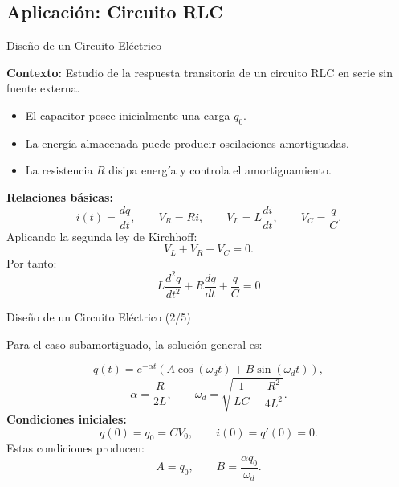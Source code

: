\documentclass[../../main.tex]{subfiles}
\begin{document}

\subsection{Aplicación: Circuito RLC}

\begin{frame}{Dise\~no de un Circuito El\'ectrico}

\textbf{Contexto:}
Estudio de la respuesta transitoria de un circuito RLC en serie
sin fuente externa.
\begin{itemize}
  \item El capacitor posee inicialmente una carga \(q_0\).
  \item La energ\'ia almacenada puede producir oscilaciones amortiguadas.
  \item La resistencia \(R\) disipa energ\'ia y controla el amortiguamiento.
\end{itemize}
\textbf{Relaciones b\'asicas:}
\[
i(t)=\frac{dq}{dt},
\qquad
V_R=Ri,
\qquad
V_L=L\frac{di}{dt},
\qquad
V_C=\frac{q}{C}.
\]
Aplicando la segunda ley de Kirchhoff:
\[
V_L+V_R+V_C=0.
\]
Por tanto:
\[
\boxed{
L\frac{d^2q}{dt^2}
+
R\frac{dq}{dt}
+
\frac{q}{C}
=0
}
\]
\end{frame}



\begin{frame}{Dise\~no de un Circuito El\'ectrico (2/5)}

Para el caso subamortiguado, la soluci\'on general es:

\[
q(t)
=
e^{-\alpha t}
\left(
A\cos(\omega_d t)
+
B\sin(\omega_d t)
\right),
\]
\[
\alpha=\frac{R}{2L},
\qquad
\omega_d
=
\sqrt{
\frac{1}{LC}
-
\frac{R^2}{4L^2}
}.
\]
\textbf{Condiciones iniciales:}
\[
q(0)=q_0=CV_0,
\qquad
i(0)=q'(0)=0.
\]
Estas condiciones producen:
\[
A=q_0,
\qquad
B=\frac{\alpha q_0}{\omega_d}.
\]

\end{frame}


\end{document}
